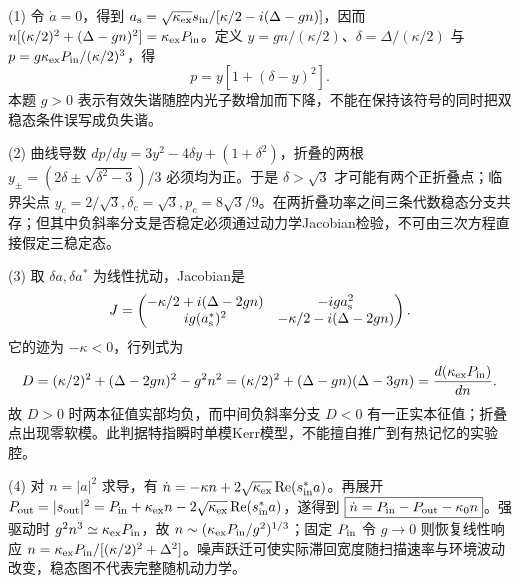 (1) 令 \(\dot a=0\)，得到 \(a_{\rm s}=\sqrt{\kappa_{\rm ex}}s_{\rm in}/[\kappa/2-i(\Delta-gn)]\)，因而 \(n[(\kappa/2)^2+(\Delta-gn)^2]=\kappa_{\rm ex}P_{\rm in}\)。定义 \(y=gn/(\kappa/2)\)、\(\delta=\Delta/(\kappa/2)\) 与 \(p=g\kappa_{\rm ex}P_{\rm in}/(\kappa/2)^3\)，得
\[
\boxed{p=y[1+(\delta-y)^2]}.
\]
本题 \(g>0\) 表示有效失谐随腔内光子数增加而下降，不能在保持该符号的同时把双稳态条件误写成负失谐。

(2) 曲线导数 \(dp/dy=3y^2-4\delta y+(1+\delta^2)\)，折叠的两根
\(y_\pm=(2\delta\pm\sqrt{\delta^2-3})/3\) 必须均为正。于是 \(\delta>\sqrt3\) 才可能有两个正折叠点；临界尖点 \(y_c=2/\sqrt3,\delta_c=\sqrt3,p_c=8\sqrt3/9\)。在两折叠功率之间三条代数稳态分支共存；但其中负斜率分支是否稳定必须通过动力学Jacobian检验，不可由三次方程直接假定三稳定态。

(3) 取 \(\delta a,\delta a^*\) 为线性扰动，Jacobian是
\[
J=\begin{pmatrix}-\kappa/2+i(\Delta-2gn)&-ig a_{\rm s}^2\\ig(a_{\rm s}^*)^2&-\kappa/2-i(\Delta-2gn)\end{pmatrix}.
\]
它的迹为 \(-\kappa<0\)，行列式为
\[
D=(\kappa/2)^2+(\Delta-2gn)^2-g^2n^2
=(\kappa/2)^2+(\Delta-gn)(\Delta-3gn)
=\frac{d(\kappa_{\rm ex}P_{\rm in})}{dn}.
\]
故 \(D>0\) 时两本征值实部均负，而中间负斜率分支 \(D<0\) 有一正实本征值；折叠点出现零软模。此判据特指瞬时单模Kerr模型，不能擅自推广到有热记忆的实验腔。

(4) 对 \(n=|a|^2\) 求导，有
\(\dot n=-\kappa n+2\sqrt{\kappa_{\rm ex}}\operatorname{Re}(s_{\rm in}^*a)\)。再展开 \(P_{\rm out}=|s_{\rm out}|^2=P_{\rm in}+\kappa_{\rm ex}n-2\sqrt{\kappa_{\rm ex}}\operatorname{Re}(s_{\rm in}^*a)\)，遂得到
\(\boxed{\dot n=P_{\rm in}-P_{\rm out}-\kappa_0n}\)。强驱动时 \(g^2n^3\simeq\kappa_{\rm ex}P_{\rm in}\)，故 \(n\sim(\kappa_{\rm ex}P_{\rm in}/g^2)^{1/3}\)；固定 \(P_{\rm in}\) 令 \(g\to0\) 则恢复线性响应 \(n=\kappa_{\rm ex}P_{\rm in}/[(\kappa/2)^2+\Delta^2]\)。噪声跃迁可使实际滞回宽度随扫描速率与环境波动改变，稳态图不代表完整随机动力学。
